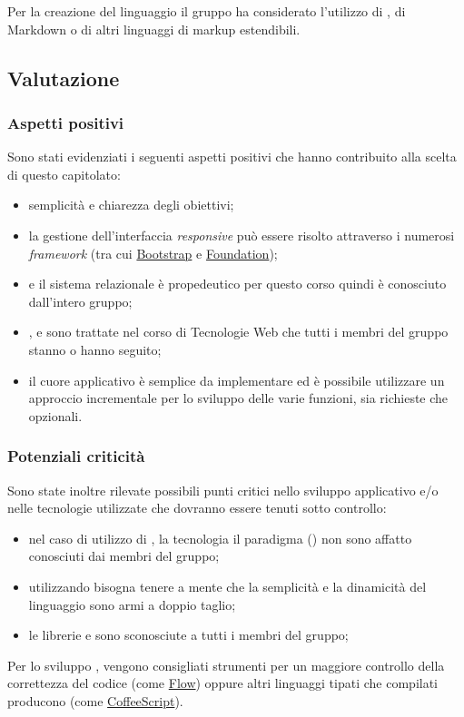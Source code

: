 \documentclass[12pt,a4paper]{article}
\begin{document}
Per la creazione del linguaggio  il gruppo ha considerato l'utilizzo di , di Markdown o di altri linguaggi di markup estendibili.

\subsection{Valutazione}
\subsubsection{Aspetti positivi}

Sono stati evidenziati i seguenti aspetti positivi che hanno contribuito alla scelta di questo capitolato:

\begin{itemize}
\item semplicità e chiarezza degli obiettivi;
\item la gestione dell'interfaccia \textit{responsive} può essere risolto attraverso i numerosi \textit{framework} (tra cui \href{http://getbootstrap.com}{Bootstrap} e \href{http://foundation.zurb.com}{Foundation});
\item {} e il sistema relazionale è propedeutico per questo corso quindi è conosciuto dall'intero gruppo;
\item {},  e  sono trattate nel corso di Tecnologie Web che tutti i membri del gruppo stanno o hanno
seguito;
\item il cuore applicativo è semplice da implementare ed è possibile utilizzare un approccio incrementale per lo sviluppo delle varie funzioni, sia richieste che opzionali.
\end{itemize}

\subsubsection{Potenziali criticità}

Sono state inoltre rilevate possibili punti critici nello sviluppo applicativo e/o nelle tecnologie utilizzate che dovranno essere tenuti sotto controllo:

\begin{itemize}
\item nel caso di utilizzo di , la tecnologia il paradigma () non sono affatto conosciuti dai membri del gruppo;
\item utilizzando  bisogna tenere a mente che la semplicità e la dinamicità del linguaggio sono armi a doppio taglio;
\item le librerie  e  sono sconosciute a tutti i membri del gruppo;
\end{itemize}
Per lo sviluppo , vengono consigliati strumenti per un maggiore controllo della correttezza del codice (come \href{http://flowtype.org}{Flow}) oppure altri linguaggi tipati che compilati producono  (come \href{http://coffeescript.org}{CoffeeScript}).
\end{document}

